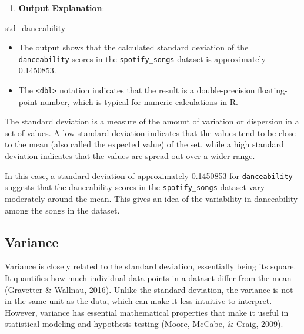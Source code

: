 \documentclass[
]{book}
\newenvironment{Shaded}{\begin{snugshade}}{\end{snugshade}}
\newcommand{\NormalTok}[1]{#1}
\providecommand{\tightlist}{%
  \setlength{\itemsep}{0pt}\setlength{\parskip}{0pt}}
\begin{document}
\begin{enumerate}
\def\labelenumi{\arabic{enumi}.}
\setcounter{enumi}{1}
\tightlist
\item
  \textbf{Output Explanation}:
\end{enumerate}

\begin{Shaded}
\begin{Highlighting}[]
\NormalTok{std\_danceability}
\end{Highlighting}
\end{Shaded}

\begin{itemize}
\tightlist
\item
  The output shows that the calculated standard deviation of the \texttt{danceability} scores in the \texttt{spotify\_songs} dataset is approximately 0.1450853.
\item
  The \texttt{\textless{}dbl\textgreater{}} notation indicates that the result is a double-precision floating-point number, which is typical for numeric calculations in R.
\end{itemize}

The standard deviation is a measure of the amount of variation or dispersion in a set of values. A low standard deviation indicates that the values tend to be close to the mean (also called the expected value) of the set, while a high standard deviation indicates that the values are spread out over a wider range.

In this case, a standard deviation of approximately 0.1450853 for \texttt{danceability} suggests that the danceability scores in the \texttt{spotify\_songs} dataset vary moderately around the mean. This gives an idea of the variability in danceability among the songs in the dataset.

\subsection*{Variance}\label{variance}

Variance is closely related to the standard deviation, essentially being its square. It quantifies how much individual data points in a dataset differ from the mean (Gravetter \& Wallnau, 2016). Unlike the standard deviation, the variance is not in the same unit as the data, which can make it less intuitive to interpret. However, variance has essential mathematical properties that make it useful in statistical modeling and hypothesis testing (Moore, McCabe, \& Craig, 2009).
\end{document}
